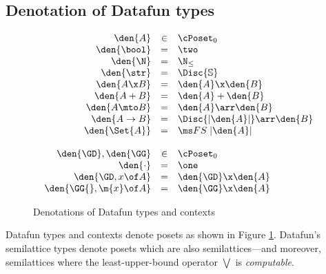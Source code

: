 \subsection{Denotation of Datafun types}
\begin{figure}
  \[\begin{array}{rcl}
  \den{A} &\in& \cPoset_0\\
  \den{\bool} &=& \two\\
  \den{\N} &=& \N_\le\\
  \den{\str} &=& \Disc{\mathbb{S}}\\
  \den{A \x B} &=& \den{A} \x \den{B}\\
  \den{A + B} &=& \den{A} + \den{B}\\
  \den{A \mto B} &=& \den{A} \arr \den{B}\\
  \den{A \uto B} &=& \Disc{\U{\den{A}}} \arr \den{B}\\
  \den{\Set{A}} &=& \FS{\U{\den{A}}}%
  \\\\
  \den{\GD}, \den{\GG} &\in& \cPoset_0\\
  \den{\cdot} &=& \one\\
  \den{\GD, x\of A} &=& \den{\GD} \x \den{A}\\
  \den{\GG{}, \m{x}\of A} &=& \den{\GG} \x \den{A}
  \end{array}\]
  \caption{Denotations of Datafun types and contexts}
  \label{fig:sem-types}
\end{figure}

Datafun types and contexts denote posets as shown in Figure \ref{fig:sem-types}.
Datafun's semilattice types denote posets which are also semilattices---and
moreover, semilattices where the least-upper-bound operator $\bigvee$ is
\emph{computable}. 


\newcommand{\fux}[2]{\Den{\vcenter{\infer{#1}{#2}}}}
\newcommand{\dg}{\;\delta\;\gamma}

